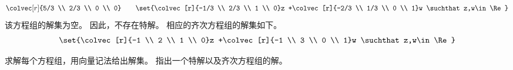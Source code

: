 \begin{exercises}
\begin{answer}
\begin{exparts}
          \begin{equation*}
            \colvec[r]{5/3 \\ 2/3 \\ 0 \\ 0}
              \qquad
            \set{\colvec[r]{-1/3 \\ 2/3 \\ 1 \\ 0}z
                 +\colvec[r]{-2/3 \\ 1/3 \\ 0 \\ 1}w
                 \suchthat z,w\in\Re}
          \end{equation*}
        \partsitem 该方程组的解集为空。
          因此，不存在特解。
          相应的齐次方程组的解集如下。
          \begin{equation*}
            \set{\colvec[r]{-1 \\ 2 \\ 1 \\ 0}z
                 +\colvec[r]{-1 \\ 3 \\ 0 \\ 1}w
                 \suchthat z,w\in\Re}
          \end{equation*}
      \end{exparts}
    \end{answer}
  \item
    求解每个方程组，用向量记法给出解集。
    指出一个特解以及齐次方程组的解。
\end{exercises}
